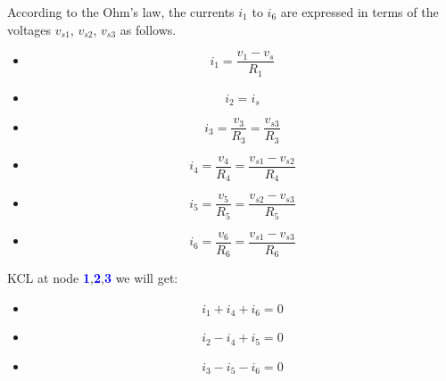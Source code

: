 \documentclass[a4 paper]{article}
\newcommand{\blue}[1]{\textcolor{blue}{#1}}
\numberwithin{equation}{section}
\newcommand{\0}{\mathbf{0}}
\begin{document}
According to the Ohm's law, the currents $i_1$ to $i_6$ are expressed in terms of the voltages $v_{s1}$, $v_{s2}$, $v_{s3}$ as follows. 
\begin{itemize} \itemsep1pt \parskip0pt  
  \item[] \hspace{6.6 cm}\begin{equation}i_1 = \frac{v_1-v_s}{R_1}\end{equation}
  \item[] \hspace{6.6 cm}\begin{equation}i_2 = i_s\end{equation}
  \item[] \hspace{6.6 cm}\begin{equation}i_3 = \frac{v_3}{R_3} = \frac{v_{s3}}{R_3}\end{equation}
  \item[] \hspace{6.6 cm}\begin{equation}i_4 = \frac{v_4}{R_4} = \frac{v_{s1}-v_{s2}}{R_4}\end{equation}
  \item[] \hspace{6.6 cm}\begin{equation}i_5 = \frac{v_5}{R_5} = \frac{v_{s2}-v_{s3}}{R_5}\end{equation}
  \item[] \hspace{6.6 cm}\begin{equation}i_6 = \frac{v_6}{R_6} = \frac{v_{s1}-v_{s3}}{R_6}\end{equation}
\end{itemize}

\vspace{8 mm}

KCL at node \blue{{\bf 1}},\blue{{\bf 2}},\blue{{\bf 3}} we will get:


\begin{itemize} \itemsep1pt \parskip0pt  
  \item[] \hspace{6.6 cm}\begin{equation}i_1 + i_4 + i_6 = 0\end{equation}
  \item[] \hspace{6.6 cm}\begin{equation}i_2 - i_4 + i_5 = 0\end{equation}
  \item[] \hspace{6.6 cm}\begin{equation}i_3 - i_5 - i_6 = 0\end{equation}
\end{itemize}
\end{document}
